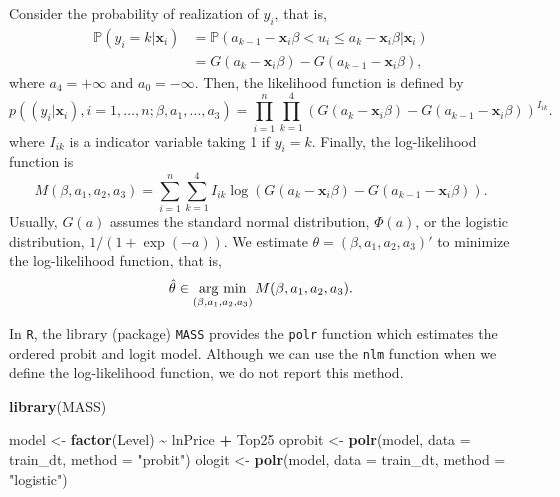 \documentclass[
  12pt,
]{article}
\newenvironment{Shaded}{\begin{snugshade}}{\end{snugshade}}
\newcommand{\DataTypeTok}[1]{\textcolor[rgb]{0.13,0.29,0.53}{#1}}
\newcommand{\KeywordTok}[1]{\textcolor[rgb]{0.13,0.29,0.53}{\textbf{#1}}}
\newcommand{\NormalTok}[1]{#1}
\newcommand{\OperatorTok}[1]{\textcolor[rgb]{0.81,0.36,0.00}{\textbf{#1}}}
\newcommand{\StringTok}[1]{\textcolor[rgb]{0.31,0.60,0.02}{#1}}
\begin{document}
Consider the probability of realization of \(y_i\), that is,
\begin{equation*}
  \begin{split}
  \mathbb{P}(y_i = k | \mathbf{x}_i) 
  &= \mathbb{P}(a_{k-1} - \mathbf{x}_i \beta < u_i \le a_k - \mathbf{x}_i \beta | \mathbf{x}_i)  \\
  &= G(a_k - \mathbf{x}_i \beta) - G(a_{k-1} - \mathbf{x}_i \beta),
  \end{split}
\end{equation*} where \(a_{4} = +\infty\) and \(a_0 = -\infty\). Then,
the likelihood function is defined by \begin{equation*}
  p((y_i|\mathbf{x}_i), i = 1, \ldots, n; \beta, a_1, \ldots, a_3)
  = \prod_{i=1}^n \prod_{k=1}^4 (G(a_k - \mathbf{x}_i \beta) - G(a_{k-1} - \mathbf{x}_i \beta))^{I_{ik}}.
\end{equation*} where \(I_{ik}\) is a indicator variable taking 1 if
\(y_i = k\). Finally, the log-likelihood function is \begin{equation*}
  M(\beta, a_1, a_2, a_3) = \sum_{i=1}^n \sum_{k=1}^4 I_{ik} \log(G(a_k - \mathbf{x}_i \beta) - G(a_{k-1} - \mathbf{x}_i \beta)).
\end{equation*} Usually, \(G(a)\) assumes the standard normal
distribution, \(\Phi(a)\), or the logistic distribution,
\(1/(1 + \exp(-a))\). We estimate \(\theta = (\beta, a_1, a_2, a_3)'\)
to minimize the log-likelihood function, that is, \begin{equation*}
  \hat{\theta} \in \mathop{\rm arg~min}\limits_{(\beta, a_1, a_2, a_3)} M(\beta, a_1, a_2, a_3).
\end{equation*}

In \texttt{R}, the library (package) \texttt{MASS} provides the
\texttt{polr} function which estimates the ordered probit and logit
model. Although we can use the \texttt{nlm} function when we define the
log-likelihood function, we do not report this method.

\begin{Shaded}
\begin{Highlighting}[]
\KeywordTok{library}\NormalTok{(MASS)}

\NormalTok{model \textless{}{-}}\StringTok{ }\KeywordTok{factor}\NormalTok{(Level) }\OperatorTok{\textasciitilde{}}\StringTok{ }\NormalTok{lnPrice }\OperatorTok{+}\StringTok{ }\NormalTok{Top25}
\NormalTok{oprobit \textless{}{-}}\StringTok{ }\KeywordTok{polr}\NormalTok{(model, }\DataTypeTok{data =}\NormalTok{ train\_dt, }\DataTypeTok{method =} \StringTok{"probit"}\NormalTok{)}
\NormalTok{ologit \textless{}{-}}\StringTok{ }\KeywordTok{polr}\NormalTok{(model, }\DataTypeTok{data =}\NormalTok{ train\_dt, }\DataTypeTok{method =} \StringTok{"logistic"}\NormalTok{)}
\end{Highlighting}
\end{Shaded}
\end{document}
